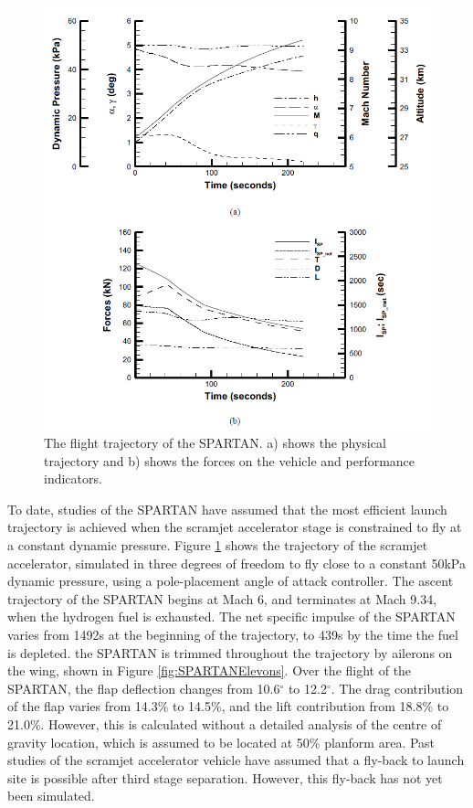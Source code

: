    \begin{figure}[!ht]
   	\centering
   	\includegraphics[width=0.9\linewidth]{figures/2_literature-review/SPARTAN_traj1}
   	\caption{The flight trajectory of the SPARTAN. a) shows the physical trajectory and b) shows the forces on the vehicle and performance indicators.}
   	\label{fig:SPARTAN_traj}
   \end{figure}
  
   To date, studies of the SPARTAN have assumed that the most efficient launch trajectory is achieved when the scramjet accelerator stage is constrained to fly at a constant dynamic pressure\cite{Preller2017b,Preller2018a}.
  Figure \ref{fig:SPARTAN_traj} shows the trajectory of the scramjet accelerator, simulated in three degrees of freedom to fly close to a constant 50kPa dynamic pressure, using a pole-placement angle of attack controller\cite{Preller2017b}.
  The ascent trajectory of the SPARTAN begins at Mach 6, and terminates at Mach 9.34, when the hydrogen fuel is exhausted\cite{Preller2018a}. 
  The net specific impulse of the SPARTAN varies from 1492s at the beginning of the trajectory, to 439s by the time the fuel is depleted\cite{Preller2017b}. 
  the SPARTAN is trimmed throughout the trajectory by ailerons on the wing, shown in Figure \ref{fig:SPARTANElevons}. Over the flight of the SPARTAN, the flap deflection changes from 10.6$^\circ$ to 12.2$^\circ$\cite{Preller2018a}. The drag contribution of the flap varies from 14.3\% to 14.5\%, and the lift contribution from 18.8\% to 21.0\%\cite{Preller2018a}. However, this is calculated without a detailed analysis of the centre of gravity location, which is assumed to be located at 50\% planform area. 
  Past studies of the scramjet accelerator vehicle have assumed that a fly-back to launch site is possible after third stage separation\cite{Preller2017b,Preller2018a}. However, this fly-back has not yet been simulated. 
  
